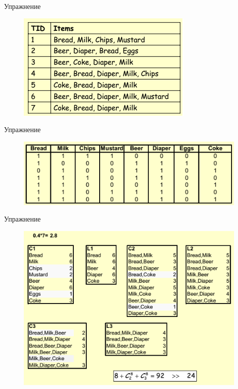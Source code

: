 \documentclass{beamer}
\begin{document}
\begin{frame}{Упражнение}
	\begin{figure}[h]
		\centering
		\includegraphics[scale=1]{images/lec08-pic17.png}
	\end{figure}
\end{frame}

\begin{frame}{Упражнение}
	\begin{figure}[h]
		\centering
		\includegraphics[scale=0.8]{images/lec08-pic18.png}
	\end{figure}
\end{frame}

\begin{frame}{Упражнение}
	\begin{figure}[h]
		\centering
		\includegraphics[scale=0.75]{images/lec08-pic19.png}
	\end{figure}
\end{frame}
\end{document}
